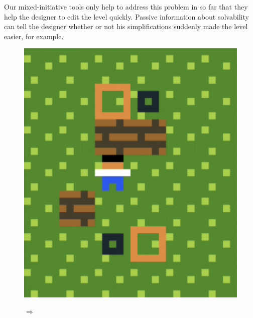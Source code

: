 \begin{description}
Our mixed-initiative tools only help to address this problem in so far that they help the designer to edit the level quickly. Passive information about solvability can tell the designer whether or not his simplifications suddenly made the level easier, for example.

\begin{figure}[!htbp]
\centering
\begin{minipage}[t]{0.25\textwidth}
\includegraphics[width=\textwidth]{figures/windowdressingpart71.png} \hfill \\
\end{minipage}
$\Longrightarrow$
\begin{minipage}[t]{0.25\textwidth}

\end{minipage}
\end{figure}
\end{description}
